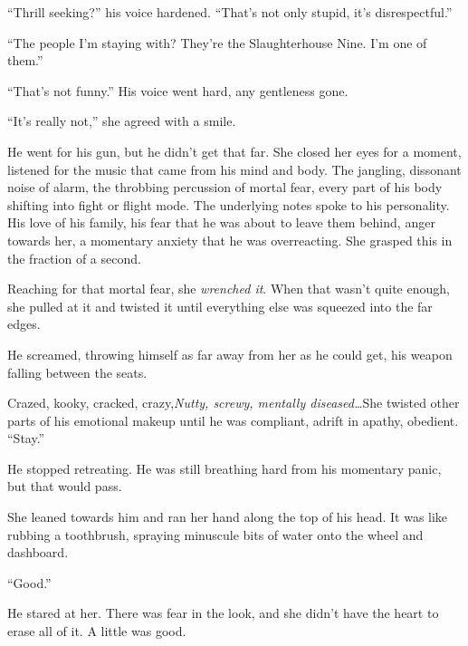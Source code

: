 ``Thrill seeking?'' his voice hardened.  ``That's not only stupid, it's disrespectful.''



``The people I'm staying with?  They're the Slaughterhouse Nine.  I'm one of them.''



``That's not funny.''  His voice went hard, any gentleness gone.



``It's really not,'' she agreed with a smile.



He went for his gun, but he didn't get that far.  She closed her eyes for a moment, listened for the music that came from his mind and body.  The jangling, dissonant noise of alarm, the throbbing percussion of mortal fear, every part of his body shifting into fight or flight mode.  The underlying notes spoke to his personality.  His love of his family, his fear that he was about to leave them behind, anger towards her, a momentary anxiety that he was overreacting.  She grasped this in the fraction of a second.



Reaching for that mortal fear, she \emph{wrenched it}.  When that wasn't quite enough, she pulled at it and twisted it until everything else was squeezed into the far edges.



He screamed, throwing himself as far away from her as he could get, his weapon falling between the seats.



Crazed, kooky, cracked, crazy,\emph{Nutty, screwy, mentally diseased\ldots}She twisted other parts of his emotional makeup until he was compliant, adrift in apathy, obedient.  ``Stay.''



He stopped retreating.  He was still breathing hard from his momentary panic, but that would pass.



She leaned towards him and ran her hand along the top of his head.  It was like rubbing a toothbrush, spraying minuscule bits of water onto the wheel and dashboard.



``Good.''



He stared at her.  There was fear in the look, and she didn't have the heart to erase all of it.  A little was good.



